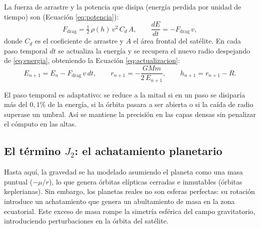 La fuerza de arrastre y la potencia que disipa (energía perdida por unidad de tiempo) son (Ecuación \ref{eq:potencia}):
\begin{equation}
  F_{\text{drag}} = \tfrac{1}{2}\,\rho(h)\, v^{2}\, C_d\, A,
  \qquad
  \frac{dE}{dt} = -F_{\text{drag}}\, v ,
  \label{eq:potencia}
\end{equation}
donde $C_d$ es el coeficiente de arrastre y $A$ el área frontal del satélite. En cada paso temporal $dt$ se actualiza la energía y se recupera el nuevo radio despejando de \eqref{eq:energia}, obteniendo la Ecuación \ref{eq:actualizacion}:
\begin{equation}
  E_{n+1} = E_{n} - F_{\text{drag}}\, v\, dt,
  \qquad
  r_{n+1} = -\frac{G M m}{2\,E_{n+1}},
  \qquad
  h_{n+1} = r_{n+1} - R .
  \label{eq:actualizacion}
\end{equation}

El paso temporal es adaptativo: se reduce a la mitad si en un paso se
disiparía más del $0,1\%$ de la energía, si la órbita pasara a ser abierta o si la caída de radio superase un umbral. Así se mantiene la precisión en las capas densas sin penalizar el cómputo en las altas.

\subsection{El término \texorpdfstring{$J_2$}{J2}: el achatamiento planetario}
\label{sec:j2}

Hasta aquí, la gravedad se ha modelado asumiendo el planeta como una masa puntual ($-\mu/r$), lo que genera órbitas elípticas cerradas e inmutables (órbitas keplerianas). Sin embargo, los planetas reales no son esferas perfectas: su rotación introduce un achatamiento que genera un abultamiento de masa en la zona ecuatorial. Este exceso de masa rompe la simetría esférica del campo gravitatorio, introduciendo perturbaciones en la órbita del satélite.

